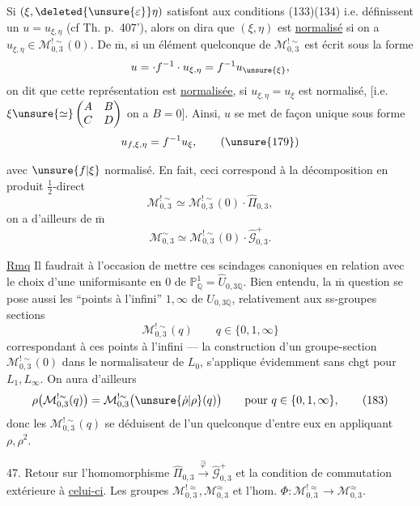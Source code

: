 Si $(\xi,\deleted{\unsure{\varepsilon}}\eta)$ satisfont aux conditions (133)(134) i.e. définissent un $u=u_{\xi,\eta}$ (cf Th. p.~407'), alors on dira que $(\xi,\eta)$ est \uline{normalisé} si on a $u_{\xi,\eta}\in\mathcal M_{0,3}^{!\sim}(0)$. De $\overline{\mathrm m}$, si un élément quelconque de $\mathcal M_{0,3}^{!\sim}$ est écrit sous la forme
\[
u=\cdot f^{-1}\cdot u_{\xi,\eta}=f^{-1}u_{\unsure{\xi}},
\]
on dit que cette représentation  est \uline{normalisée}, si $u_{\xi,\eta}=u_\xi$ est normalisé, [i.e.   $\xi\unsure{\simeq}\begin{pmatrix}A&B\\C&D\end{pmatrix}$  on a $B=0$]. Ainsi,  $u$ se met de façon unique sous forme
\[
u_{f,\xi,\eta}=f^{-1}u_\xi,
\tag{\unsure{179}}
\]

avec $\unsure{f|\xi}$ normalisé. En fait, ceci correspond à la décomposition en produit $\frac12$-direct
\[
\mathcal M_{0,3}^{!\sim}\simeq\mathcal M_{0,3}^{!\sim}(0)\cdot\widehat\Pi_{0,3},
\tag{180}
\]
on a d'ailleurs de $\overline{\mathrm m}$
\[
\mathcal M_{0,3}^{\sim}\simeq\mathcal M_{0,3}^{!\sim}(0)\cdot\widehat{\mathcal G}_{0,3}^{+}.
\tag{181}
\]

\uline{Rmq} Il faudrait à l'occasion  de mettre ces scindages canoniques en relation avec le choix d'une uniformisante en $0$ de $\mathbb P^1_{\mathbb Q}=\widehat U_{0,3\mathbb Q}$. Bien entendu, la $\overline{\mathrm m}$ question se pose aussi  les  ``points à l'infini'' $1,\infty$ de $U_{0,3\mathbb Q}$, relativement aux ss-groupes sections
\[
\mathcal M_{0,3}^{!\sim}(q)\qquad q\in\{0,1,\infty\}
\tag{182}
\]
correspondant à ces points à l'infini --- la construction d'un groupe-section $\mathcal M_{0,3}^{!\sim}(0)$ dans le normalisateur de $L_0$, s'applique évidemment sans chgt pour $L_1,L_\infty$. On aura d'ailleurs
\[
\rho\bigl(\mathcal M_{0,3}^{!\sim}(q)\bigr)=\mathcal M_{0,3}^{!\sim}\bigl(\unsure{\dot\rho|\rho}(q)\bigr)\qquad\text{pour }q\in\{0,1,\infty\},
\tag{183}
\]
donc les  $\mathcal M_{0,3}^{!\sim}(q)$ se déduisent de l'un quelconque d'entre eux en appliquant $\rho,\rho^2$.

47. Retour sur l'homomorphisme $\widehat\Pi_{0,3}\xrightarrow{\widehat\varphi}\widehat{\mathcal G}_{0,3}^{+}$ et la condition de commutation extérieure à \uline{celui-ci}. Les groupes $\mathcal M_{0,3}^{!\approx},\mathcal M_{0,3}^{\approx}$ et l'hom. $\Phi:\mathcal M_{0,3}^{!\approx}\longrightarrow\mathcal M_{0,3}^{\approx}$.

